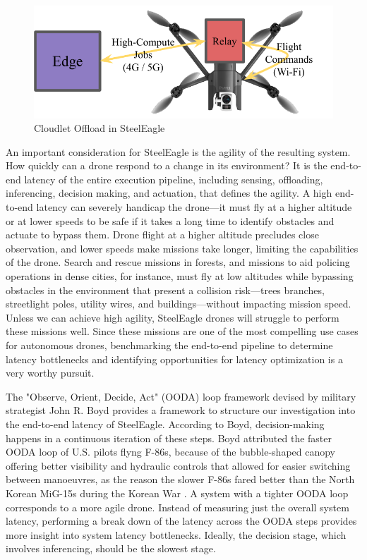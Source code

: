 \begin{figure}[htbp]
\centerline{\includegraphics[width = .6\textwidth]{figs/steeleagle-drone-arch-cropped.pdf}}
\caption{Cloudlet Offload in SteelEagle}
\label{fig:steeleagle-drone-arch}
\end{figure}

An important consideration for SteelEagle is the agility of the resulting
system.  How quickly can a drone respond to a change in its environment? It is
the end-to-end latency of the entire execution pipeline, including sensing,
offloading, inferencing, decision making, and actuation, that defines the
agility. A high end-to-end latency can severely handicap the drone---it must
fly at a higher altitude or at lower speeds to be safe if it takes a long time
to identify obstacles and actuate to bypass them. Drone flight at a higher
altitude precludes close observation, and lower speeds make missions take
longer, limiting the capabilities of the drone. Search and rescue missions in
forests, and missions to aid policing operations in dense cities, for instance,
must fly at low altitudes while bypassing obstacles in the environment that
present a collision risk---trees branches, streetlight poles, utility
wires, and buildings---without impacting mission speed. Unless we can achieve
high agility, SteelEagle drones will struggle to perform these missions well.
Since these missions are one of the most compelling use cases for autonomous
drones, benchmarking the end-to-end pipeline to determine latency bottlenecks
and identifying opportunities for latency optimization is a very worthy pursuit.

The "Observe, Orient, Decide, Act" (OODA) loop framework devised by military
strategist John R. Boyd provides a framework to structure our investigation
into the end-to-end latency of SteelEagle. According to Boyd, decision-making
happens in a continuous iteration of these steps. Boyd attributed the faster
OODA loop of U.S. pilots flyng F-86s, because of the bubble-shaped canopy
offering better visibility and hydraulic controls that allowed for easier
switching between manoeuvres, as the reason the slower F-86s fared better than
the North Korean MiG-15s during the Korean War \cite{morton1995}. A system with
a tighter OODA loop corresponds to a more agile drone. Instead of measuring
just the overall system latency, performing a break down of the latency across
the OODA steps provides more insight into system latency bottlenecks. Ideally,
the decision stage, which involves inferencing, should be the slowest stage.

